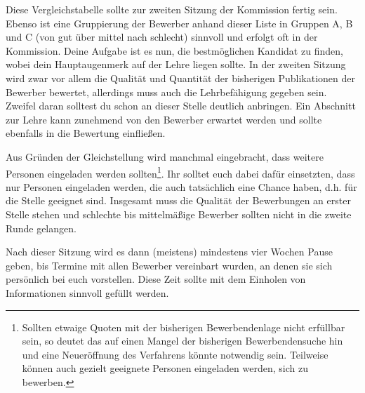 Diese Vergleichstabelle sollte zur zweiten Sitzung der Kommission fertig sein. Ebenso ist eine Gruppierung der Bewerber anhand dieser Liste in Gruppen A, B und C (von gut über mittel nach schlecht) sinnvoll und erfolgt oft in der Kommission.
Deine Aufgabe ist es nun, die bestmöglichen Kandidat zu finden, wobei dein Hauptaugenmerk auf der Lehre liegen sollte. 
In der zweiten Sitzung wird zwar vor allem die Qualität und Quantität der bisherigen Publikationen der Bewerber bewertet, allerdings muss auch die Lehrbefähigung gegeben sein. Zweifel daran solltest du schon an dieser Stelle deutlich anbringen.
Ein Abschnitt zur Lehre kann zunehmend von den Bewerber erwartet werden und sollte ebenfalls in die Bewertung einfließen.

Aus Gründen der Gleichstellung wird manchmal eingebracht, dass weitere Personen eingeladen werden sollten\footnote{Sollten etwaige Quoten mit der bisherigen Bewerbendenlage nicht erfüllbar sein, so deutet das auf einen Mangel der bisherigen Bewerbendensuche hin und eine Neueröffnung des Verfahrens könnte notwendig sein. Teilweise können auch gezielt geeignete Personen eingeladen werden, sich zu bewerben.}.
Ihr solltet euch dabei dafür einsetzten, dass nur Personen eingeladen werden, die auch tatsächlich eine Chance haben, d.h. für die Stelle geeignet sind.
Insgesamt muss die Qualität der Bewerbungen an erster Stelle stehen und schlechte bis mittelmäßige Bewerber sollten nicht in die zweite Runde gelangen.

Nach dieser Sitzung wird es dann (meistens) mindestens vier Wochen Pause geben, bis Termine mit allen Bewerber vereinbart wurden, an denen sie sich persönlich bei euch vorstellen. Diese Zeit sollte mit dem Einholen von Informationen sinnvoll gefüllt werden.

